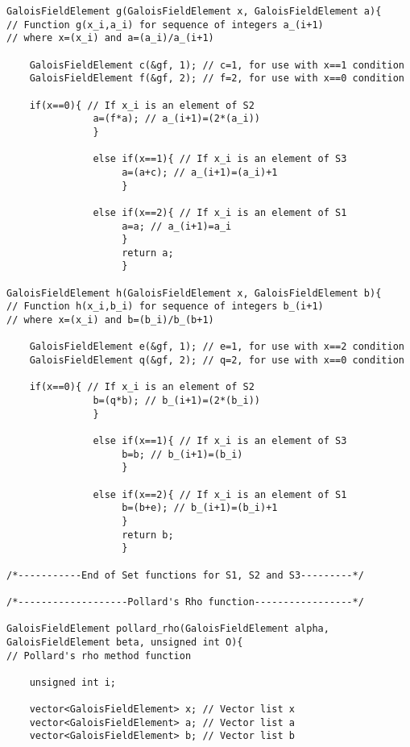 \documentclass[iwp,first]{luthesis}
\begin{document}
\begin{verbatim}
GaloisFieldElement g(GaloisFieldElement x, GaloisFieldElement a){ 
// Function g(x_i,a_i) for sequence of integers a_(i+1)
// where x=(x_i) and a=(a_i)/a_(i+1)
    
	GaloisFieldElement c(&gf, 1); // c=1, for use with x==1 condition
	GaloisFieldElement f(&gf, 2); // f=2, for use with x==0 condition

    if(x==0){ // If x_i is an element of S2
               a=(f*a); // a_(i+1)=(2*(a_i))
               }
               
               else if(x==1){ // If x_i is an element of S3
                    a=(a+c); // a_(i+1)=(a_i)+1
                    }
                    
               else if(x==2){ // If x_i is an element of S1
                    a=a; // a_(i+1)=a_i
                    } 
                    return a;      
                    }
                    
GaloisFieldElement h(GaloisFieldElement x, GaloisFieldElement b){ 
// Function h(x_i,b_i) for sequence of integers b_(i+1)
// where x=(x_i) and b=(b_i)/b_(b+1)
    
	GaloisFieldElement e(&gf, 1); // e=1, for use with x==2 condition
	GaloisFieldElement q(&gf, 2); // q=2, for use with x==0 condition

    if(x==0){ // If x_i is an element of S2
               b=(q*b); // b_(i+1)=(2*(b_i))
               }
               
               else if(x==1){ // If x_i is an element of S3
                    b=b; // b_(i+1)=(b_i)
                    }
                    
               else if(x==2){ // If x_i is an element of S1
                    b=(b+e); // b_(i+1)=(b_i)+1
                    }
                    return b;
                    }
                                   
/*-----------End of Set functions for S1, S2 and S3---------*/

/*-------------------Pollard's Rho function-----------------*/

GaloisFieldElement pollard_rho(GaloisFieldElement alpha, 
GaloisFieldElement beta, unsigned int O){ 
// Pollard's rho method function
    
    unsigned int i;
    
    vector<GaloisFieldElement> x; // Vector list x
    vector<GaloisFieldElement> a; // Vector list a
    vector<GaloisFieldElement> b; // Vector list b
    

\end{verbatim}
\end{document}
